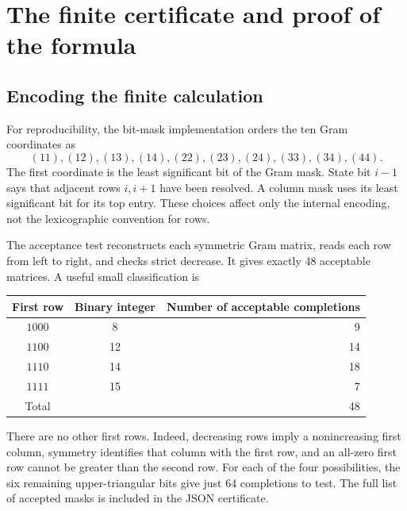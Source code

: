 \documentclass[11pt,letterpaper]{article}
\theoremstyle{definition}
\newcommand{\1}{\mathbf 1}
\begin{document}
\section{The finite certificate and proof of the formula}
\label{sec:certificate}

\subsection{Encoding the finite calculation}
For reproducibility, the bit-mask implementation orders the ten Gram
coordinates as
\begin{equation}\label{eq:coordinateorder}
 (11),(12),(13),(14),(22),(23),(24),(33),(34),(44).
\end{equation}
The first coordinate is the least significant bit of the Gram mask. State bit
$i-1$ says that adjacent rows $i,i+1$ have been resolved. A column mask uses its
least significant bit for its top entry. These choices affect only the internal
encoding, not the lexicographic convention for rows.

The acceptance test reconstructs each symmetric Gram matrix, reads each row
from left to right, and checks strict decrease. It gives exactly 48 acceptable
matrices. A useful small classification is
\begin{center}
\begin{tabular}{ccr}
\toprule
First row & Binary integer & Number of acceptable completions\\
\midrule
$1000$ & 8  & 9\\
$1100$ & 12 & 14\\
$1110$ & 14 & 18\\
$1111$ & 15 & 7\\
\midrule
Total &&48\\
\bottomrule
\end{tabular}
\end{center}
There are no other first rows. Indeed, decreasing rows imply a nonincreasing
first column, symmetry identifies that column with the first row, and an
all-zero first row cannot be greater than the second row. For each of the four
possibilities, the six remaining upper-triangular bits give just 64 completions
to test. The full list of accepted masks is included in the JSON certificate.
\end{document}
